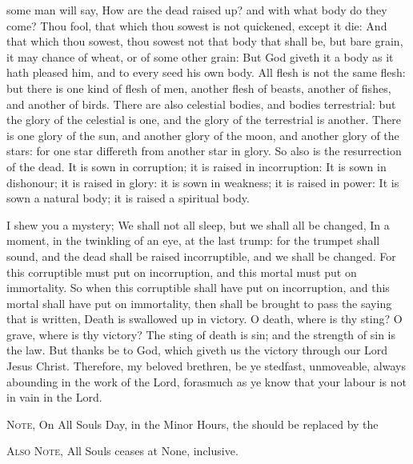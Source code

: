 \clearpage
{}
 some man will say, How are the dead raised up? and with what body do they come? Thou fool, that which thou sowest is not quickened, except it die: And that which thou sowest, thou sowest not that body that shall be, but bare grain, it may chance of wheat, or of some other grain: But God giveth it a body as it hath pleased him, and to every seed his own body. All flesh is not the same flesh: but there is one kind of flesh of men, another flesh of beasts, another of fishes, and another of birds. There are also celestial bodies, and bodies terrestrial: but the glory of the celestial is one, and the glory of the terrestrial is another. There is one glory of the sun, and another glory of the moon, and another glory of the stars: for one star differeth from another star in glory. So also is the resurrection of the dead. It is sown in corruption; it is raised in incorruption: It is sown in dishonour; it is raised in glory: it is sown in weakness; it is raised in power: It is sown a natural body; it is raised a spiritual body.

 I shew you a mystery; We shall not all sleep, but we shall all be changed, In a moment, in the twinkling of an eye, at the last trump: for the trumpet shall sound, and the dead shall be raised incorruptible, and we shall be changed. For this corruptible must put on incorruption, and this mortal must put on immortality. So when this corruptible shall have put on incorruption, and this mortal shall have put on immortality, then shall be brought to pass the saying that is written, Death is swallowed up in victory. O death, where is thy sting? O grave, where is thy victory? The sting of death is sin; and the strength of sin is the law. But thanks be to God, which giveth us the victory through our Lord Jesus Christ. Therefore, my beloved brethren, be ye stedfast, unmoveable, always abounding in the work of the Lord, forasmuch as ye know that your labour is not in vain in the Lord.

\begin{rubric}
	\textsc{Note,} On All Souls Day, in the Minor Hours, the  should be replaced by the 
\end{rubric}

\begin{rubric}
	\textsc{Also Note,} All Souls ceases at None, inclusive.
\end{rubric}


